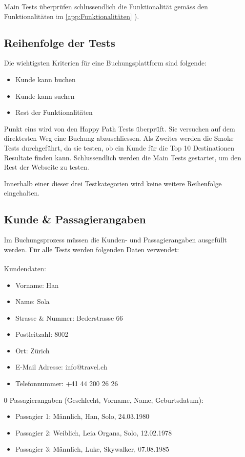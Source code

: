 Main Tests überprüfen schlussendlich die Funktionalität gemäss den Funktionalitäten im \cref{app:Funktionalitäten} ).

\subsection{Reihenfolge der Tests}
Die wichtigsten Kriterien für eine Buchungsplattform sind folgende:
\begin{itemize}
\item Kunde kann buchen
\item Kunde kann suchen
\item Rest der Funktionalitäten
\end{itemize}
Punkt eins wird von den Happy Path Tests überprüft. Sie versuchen auf dem direktesten Weg eine Buchung abzuschliessen. Als Zweites werden die Smoke Tests durchgeführt, da sie testen, ob ein Kunde für die Top 10 Destinationen Resultate finden kann. Schlussendlich werden die Main Tests gestartet, um den Rest der Webseite zu testen.

Innerhalb einer dieser drei Testkategorien wird keine weitere Reihenfolge eingehalten.

\subsection{Kunde \& Passagierangaben}
\label{sec:Konzept:Übersicht:Angaben}
Im Buchungsprozess müssen die Kunden- und Passagierangaben ausgefüllt werden. Für alle Tests werden folgenden Daten verwendet:\\
\\  
Kundendaten:
\begin{itemize}
\item Vorname: Han
\item Name: Sola
\item Strasse \& Nummer: Bederstrasse 66
\item Postleitzahl: 8002
\item Ort: Zürich
\item E-Mail Adresse: info@travel.ch
\item Telefonnummer: +41 44 200 26 26 
\end{itemize}

\begin{addmargin*}[0cm]{0\marginwidth}
Passagierangaben (Geschlecht, Vorname, Name, Geburtsdatum):
	\begin{itemize}
	\item Passagier 1: Männlich, Han, Solo, 24.03.1980
	\item Passagier 2: Weiblich, Leia Organa, Solo, 12.02.1978
	\item Passagier 3: Männlich, Luke, Skywalker, 07.08.1985
	\end{itemize}
\end{addmargin*}



